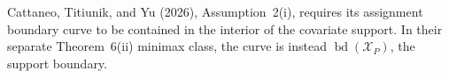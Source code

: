 Cattaneo, Titiunik, and Yu (2026), Assumption~2(i), requires its assignment boundary curve to be contained in the interior of the covariate support.  In their separate Theorem~6(ii) minimax class, the curve is instead \(\operatorname{bd}(\mathcal X_P)\), the support boundary.